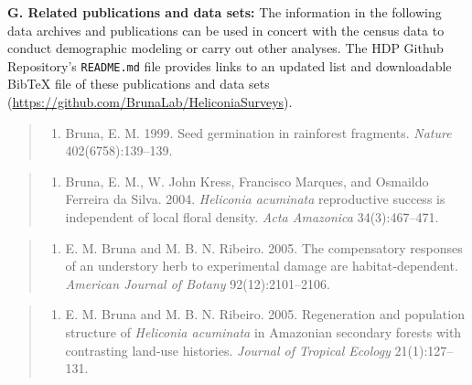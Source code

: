 \documentclass[
  12pt,
  man, donotrepeattitle,floatsintext]{apa6}
\providecommand{\tightlist}{%
  \setlength{\itemsep}{0pt}\setlength{\parskip}{0pt}}
\begin{document}
\noindent  
\textbf{G. Related publications and data sets:} The information in the following data archives and publications can be used in concert with the census data to conduct demographic modeling or carry out other analyses. The HDP Github Repository's \texttt{README.md} file provides links to an updated list and downloadable BibTeX file of these publications and data sets (\url{https://github.com/BrunaLab/HeliconiaSurveys}).

\begin{quote}
\begin{enumerate}
\def\labelenumi{\arabic{enumi}.}
\tightlist
\item
  Bruna, E. M. 1999. Seed germination in rainforest fragments. \emph{Nature} 402(6758):139--139.
\end{enumerate}
\end{quote}

\begin{quote}
\begin{enumerate}
\def\labelenumi{\arabic{enumi}.}
\setcounter{enumi}{1}
\tightlist
\item
  Bruna, E. M., W. John Kress, Francisco Marques, and Osmaildo Ferreira da Silva. 2004. \emph{Heliconia acuminata} reproductive success is independent of local floral density. \emph{Acta Amazonica} 34(3):467--471.
\end{enumerate}
\end{quote}

\begin{quote}
\begin{enumerate}
\def\labelenumi{\arabic{enumi}.}
\setcounter{enumi}{2}
\tightlist
\item
  E. M. Bruna and M. B. N. Ribeiro. 2005. The compensatory responses of an understory herb to experimental damage are habitat‐dependent. \emph{American Journal of Botany} 92(12):2101--2106.
\end{enumerate}
\end{quote}

\begin{quote}
\begin{enumerate}
\def\labelenumi{\arabic{enumi}.}
\setcounter{enumi}{3}
\tightlist
\item
  E. M. Bruna and M. B. N. Ribeiro. 2005. Regeneration and population structure of \emph{Heliconia acuminata} in Amazonian secondary forests with contrasting land-use histories. \emph{Journal of Tropical Ecology} 21(1):127--131.
\end{enumerate}
\end{quote}
\end{document}

